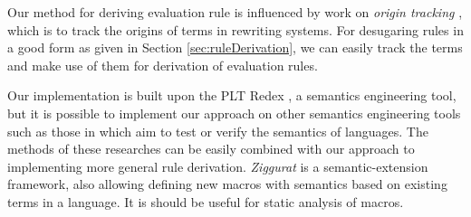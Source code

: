 Our method for deriving evaluation rule is influenced by work on \emph{origin tracking} \cite{origintracking}, which is to  track the origins of terms in rewriting systems.
For desugaring rules in a good form as given in Section \ref{sec:ruleDerivation}, we can easily track the terms and make use of them for derivation of evaluation rules. 
%

Our implementation is built upon the PLT Redex \cite{SEwPR}, a semantics engineering tool, but it is possible to implement our approach on other semantics engineering tools such as those in \cite{dynsem,Ksemantic} which aim to test or verify the semantics of languages. The methods of these researches can be easily combined with our approach to implementing more general rule derivation. \emph{Ziggurat} \cite{Ziggurat} is a semantic-extension framework, also allowing defining new macros with semantics based on existing terms in a language. It is should be useful for static analysis of macros.

